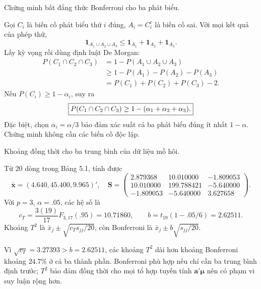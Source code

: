 \begin{problem}[Bài 5.6.]
Chứng minh bất đẳng thức Bonferroni cho ba phát biểu.
\end{problem}
\begin{solution}
Gọi $C_i$ là biến cố phát biểu thứ $i$ đúng, $A_i=C_i^c$ là biến cố sai.
Với mọi kết quả của phép thử,
\[
\mathbf1_{A_1\cup A_2\cup A_3}\le
\mathbf1_{A_1}+\mathbf1_{A_2}+\mathbf1_{A_3}.
\]
Lấy kỳ vọng rồi dùng định luật De Morgan:
\[
\begin{aligned}
P(C_1\cap C_2\cap C_3)
&=1-P(A_1\cup A_2\cup A_3)\\
&\ge1-P(A_1)-P(A_2)-P(A_3)\\
&=P(C_1)+P(C_2)+P(C_3)-2.
\end{aligned}
\]
Nếu $P(C_i)\ge1-\alpha_i$, suy ra
\[
\boxed{P(C_1\cap C_2\cap C_3)\ge1-(\alpha_1+\alpha_2+\alpha_3).}
\]
Đặc biệt, chọn $\alpha_i=\alpha/3$ bảo đảm xác suất cả ba phát biểu đúng
ít nhất $1-\alpha$. Chứng minh không cần các biến cố độc lập.
\end{solution}

\begin{problem}[Bài 5.7.]
Khoảng đồng thời cho ba trung bình của dữ liệu mồ hôi.
\end{problem}
\begin{solution}
Từ $20$ dòng trong Bảng 5.1, tính được
\[
\bar{\mathbf x}=(4.640,45.400,9.965)',\quad
\mathbf S=\begin{pmatrix}
2.879368&10.010000&-1.809053\\
10.010000&199.788421&-5.640000\\
-1.809053&-5.640000&3.627658
\end{pmatrix}.
\]
Với $p=3$, $\alpha=.05$, các hệ số là
\[
c_T=\frac{3(19)}{17}F_{3,17}(.95)=10.71860,\qquad
b=t_{19}(1-.05/6)=2.62511.
\]
Khoảng $T^2$ là $\bar x_j\pm\sqrt{c_Ts_{jj}/20}$,
còn Bonferroni là $\bar x_j\pm b\sqrt{s_{jj}/20}$.

Vì $\sqrt{c_T}=3.27393>b=2.62511$, các khoảng $T^2$ dài hơn khoảng
Bonferroni khoảng $24.7\%$ ở cả ba thành phần. Bonferroni phù hợp nếu chỉ
cần ba trung bình định trước; $T^2$ bảo đảm đồng thời cho mọi tổ hợp tuyến tính
$\mathbf a'\boldsymbol\mu$ nên có phạm vi suy luận rộng hơn.
\end{solution}

